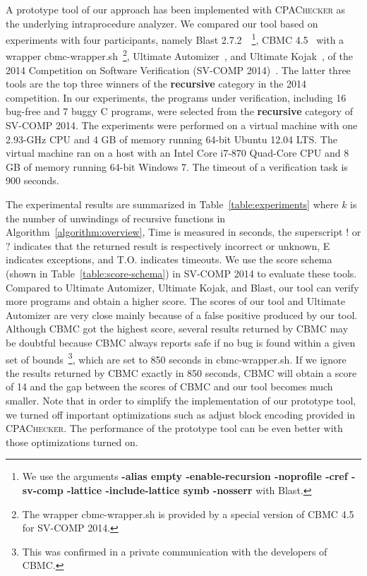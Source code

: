 \newcommand{\safe}{S}
\newcommand{\unsafe}{U}
\newcommand{\unknown}{?}
\newcommand{\exception}{E}
\newcommand{\timeout}{T.O.}
\newcommand{\unknownmark}{\ensuremath{^?}}
\newcommand{\wrongmark}{\ensuremath{^!}}

A prototype tool of our approach has been implemented with
\textsc{CPAChecker} as the underlying intraprocedure analyzer.
We compared our tool based on experiments with four participants,
namely Blast 2.7.2~\cite{BeyerHJM07}~\footnote{We use the arguments
  \textbf{-alias empty -enable-recursion -noprofile -cref -sv-comp
    -lattice -include-lattice symb -nosserr} with Blast.},
CBMC 4.5~\cite{ClarkeKL04} with a wrapper
cbmc-wrapper.sh~\footnote{The wrapper cbmc-wrapper.sh is provided by a
  special version of CBMC 4.5 for SV-COMP 2014.}, Ultimate
Automizer~\cite{HeizmannCDEHLNSP13}, and Ultimate Kojak~\cite{Kojak},
of the 2014 Competition on Software Verification (SV-COMP
2014)~\cite{svcomp14}.
The latter three tools are the top three winners of the
\textbf{recursive} category in the 2014 competition.
In our experiments, the programs under verification, including 16
bug-free and 7 buggy C programs, were selected from the
\textbf{recursive} category of SV-COMP 2014.
The experiments were performed on a virtual machine with one 2.93-GHz 
CPU and 4 GB of memory running 64-bit Ubuntu 12.04 LTS.
The virtual machine ran on a host with an Intel Core i7-870 Quad-Core
CPU and 8 GB of memory running 64-bit Windows 7.
The timeout of a verification task is 900 seconds.

The experimental results are summarized in
Table~\ref{table:experiments} where $k$ is the number of unwindings of
recursive functions in Algorithm~\ref{algorithm:overview}, Time is
measured in seconds, the superscript $!$ or $?$ indicates that the
returned result is respectively incorrect or unknown, E indicates
exceptions, and T.O. indicates timeouts.
We use the score schema (shown in Table~\ref{table:score-schema}) in
SV-COMP 2014 to evaluate these tools.
Compared to Ultimate Automizer, Ultimate Kojak, and Blast, our tool
can verify more programs and obtain a higher score.
The scores of our tool and Ultimate Automizer are very close mainly
because of a false positive produced by our tool.
Although CBMC got the highest score, several results returned by CBMC
may be doubtful because CBMC always reports safe if no bug is found
within a given set of bounds~\footnote{This was confirmed in a private
  communication with the developers of CBMC.}, which are set to 850
seconds in cbmc-wrapper.sh.
If we ignore the results returned by CBMC exactly in 850 seconds, CBMC 
will obtain a score of 14 and the gap between the scores of CBMC and
our tool becomes much smaller.
Note that in order to simplify the implementation of our prototype
tool, we turned off important optimizations such as adjust block
encoding provided in \textsc{CPAChecker}.
The performance of the prototype tool can be even better with those
optimizations turned on.


